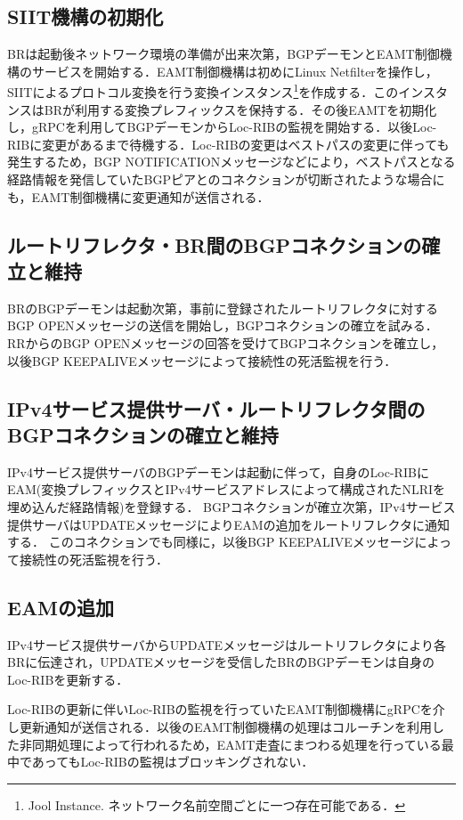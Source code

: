 \subsection{SIIT機構の初期化}
BRは起動後ネットワーク環境の準備が出来次第，BGPデーモンとEAMT制御機構のサービスを開始する．EAMT制御機構は初めにLinux Netfilterを操作し，SIITによるプロトコル変換を行う変換インスタンス\footnote{Jool Instance. ネットワーク名前空間ごとに一つ存在可能である．}を作成する．このインスタンスはBRが利用する変換プレフィックスを保持する．その後EAMTを初期化し，gRPCを利用してBGPデーモンからLoc-RIBの監視を開始する．以後Loc-RIBに変更があるまで待機する．Loc-RIBの変更はベストパスの変更に伴っても発生するため，BGP NOTIFICATIONメッセージなどにより，ベストパスとなる経路情報を発信していたBGPピアとのコネクションが切断されたような場合にも，EAMT制御機構に変更通知が送信される．


\subsection{ルートリフレクタ・BR間のBGPコネクションの確立と維持}
BRのBGPデーモンは起動次第，事前に登録されたルートリフレクタに対するBGP OPENメッセージの送信を開始し，BGPコネクションの確立を試みる．
RRからのBGP OPENメッセージの回答を受けてBGPコネクションを確立し，以後BGP KEEPALIVEメッセージによって接続性の死活監視を行う．



\subsection{IPv4サービス提供サーバ・ルートリフレクタ間のBGPコネクションの確立と維持}
IPv4サービス提供サーバのBGPデーモンは起動に伴って，自身のLoc-RIBにEAM(変換プレフィックスとIPv4サービスアドレスによって構成されたNLRIを埋め込んだ経路情報)を登録する．
BGPコネクションが確立次第，IPv4サービス提供サーバはUPDATEメッセージによりEAMの追加をルートリフレクタに通知する．
このコネクションでも同様に，以後BGP KEEPALIVEメッセージによって接続性の死活監視を行う．


\subsection{EAMの追加}
IPv4サービス提供サーバからUPDATEメッセージはルートリフレクタにより各BRに伝達され，UPDATEメッセージを受信したBRのBGPデーモンは自身のLoc-RIBを更新する．

Loc-RIBの更新に伴いLoc-RIBの監視を行っていたEAMT制御機構にgRPCを介し更新通知が送信される．以後のEAMT制御機構の処理はコルーチンを利用した非同期処理によって行われるため，EAMT走査にまつわる処理を行っている最中であってもLoc-RIBの監視はブロッキングされない．

